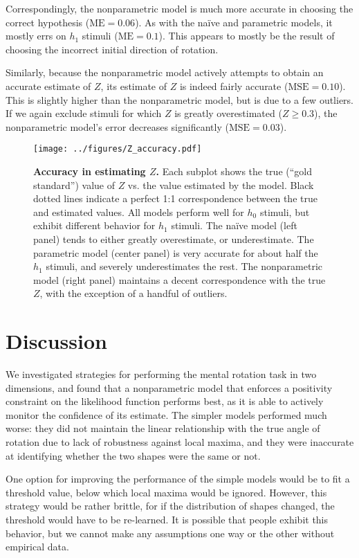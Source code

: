 \documentclass{article} %
\newcommand{\MSE}[0]{\mathrm{MSE}}
\newcommand{\ME}[0]{\mathrm{ME}}
\newcommand{\naive}[0]{na\"ive}
\begin{document}
Correspondingly, the nonparametric model is much more accurate in
choosing the correct hypothesis ($\ME{}=0.06$). As with the \naive{}
and parametric models, it mostly errs on $h_1$ stimuli
($\ME{}=0.1$). This appears to mostly be the result of choosing the
incorrect initial direction of rotation.

Similarly, because the nonparametric model actively attempts to obtain
an accurate estimate of $Z$, its estimate of $Z$ is indeed fairly
accurate ($\MSE{}=0.10$). This is slightly higher than the
nonparametric model, but is due to a few outliers. If we again exclude
stimuli for which $Z$ is greatly overestimated ($Z\geq 0.3$), the
nonparametric model's error decreases significantly ($\MSE{}=0.03$).

\begin{figure}[t]
  \centering
  \texttt{[image: ../figures/Z\_accuracy.pdf]}
  \caption{\textbf{Accuracy in estimating $Z$.} Each subplot shows the
    true (``gold standard'') value of $Z$ vs. the value estimated by
    the model. Black dotted lines indicate a perfect 1:1
    correspondence between the true and estimated values. All models
    perform well for $h_0$ stimuli, but exhibit different behavior for
    $h_1$ stimuli. The \naive{} model (left panel) tends to either
    greatly overestimate, or underestimate. The parametric model
    (center panel) is very accurate for about half the $h_1$ stimuli,
    and severely underestimates the rest. The nonparametric model
    (right panel) maintains a decent correspondence with the true $Z$,
    with the exception of a handful of outliers.}
  \label{fig:accuracy}
\end{figure}

\section{Discussion}

We investigated strategies for performing the mental rotation task
\cite{Shepard1971} in two dimensions, and found that a nonparametric
model that enforces a positivity constraint on the likelihood function
performs best, as it is able to actively monitor the confidence of its
estimate. The simpler models performed much worse: they did not
maintain the linear relationship with the true angle of rotation due
to lack of robustness against local maxima, and they were inaccurate
at identifying whether the two shapes were the same or not.

One option for improving the performance of the simple models would be
to fit a threshold value, below which local maxima would be
ignored. However, this strategy would be rather brittle, for if the
distribution of shapes changed, the threshold would have to be
re-learned. It is possible that people exhibit this behavior, but we
cannot make any assumptions one way or the other without empirical
data.
\end{document}
